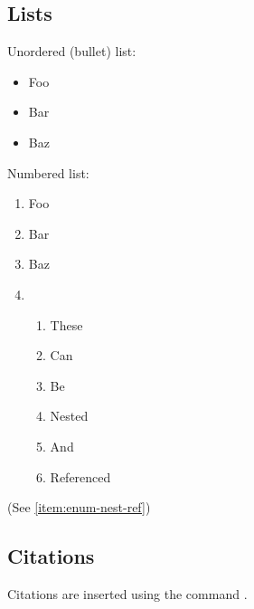 \documentclass{projdoc}
\begin{document}
\subsection{Lists}

Unordered (bullet) list:

\begin{itemize}
	\item Foo
	\item Bar
	\item Baz
\end{itemize}

Numbered list:

\begin{enumerate}
	\item Foo
	\item Bar
	\item Baz
	\item \begin{enumerate}
		\item These
		\item Can
		\item Be
		\item Nested
		\item And
		\item \label{item:enum-nest-ref} Referenced
	\end{enumerate}
\end{enumerate}

(See \cref{item:enum-nest-ref})

\subsection{Citations}

Citations are inserted using the \codeinline{\autocite} command \autocite{rfc:3339}.
\end{document}
